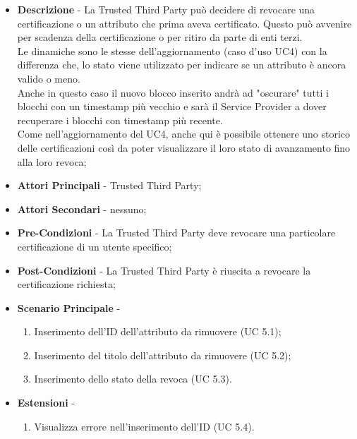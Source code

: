 \begin{itemize}
	\item \textbf{Descrizione} - La Trusted Third Party può decidere di revocare una certificazione o un attributo che prima aveva certificato. Questo può avvenire per scadenza della certificazione o per ritiro da parte di enti terzi.\\
	Le dinamiche sono le stesse dell'aggiornamento (caso d'uso UC4) con la differenza che, lo stato viene utilizzato per indicare se un attributo è ancora valido o meno.\\
	Anche in questo caso il nuovo blocco inserito andrà ad "oscurare" tutti i blocchi con un timestamp più vecchio e sarà il Service Provider a dover recuperare i blocchi con timestamp più recente.\\
	Come nell'aggiornamento del UC4, anche qui è possibile ottenere uno storico delle certificazioni così da poter visualizzare il loro stato di avanzamento fino alla loro revoca;
	\item \textbf{Attori Principali} - Trusted Third Party;
	\item \textbf{Attori Secondari} - nessuno;
	\item \textbf{Pre-Condizioni} - La Trusted Third Party deve revocare una particolare certificazione di un utente specifico;
	\item \textbf{Post-Condizioni} - La Trusted Third Party è riuscita a revocare la certificazione richiesta;
	\item \textbf{Scenario Principale} -
	\begin{enumerate}
		\item Inserimento dell'ID dell'attributo da rimuovere (UC 5.1);
		\item Inserimento del titolo dell'attributo da rimuovere (UC 5.2);
		\item Inserimento dello stato della revoca (UC 5.3).
	\end{enumerate}
	\item \textbf{Estensioni} -
	\begin{enumerate}
		\item Visualizza errore nell'inserimento dell'ID (UC 5.4).
	\end{enumerate}
\end{itemize}
